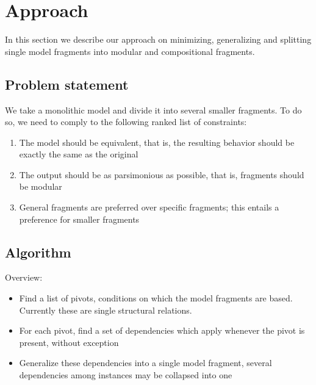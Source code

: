 \documentclass{article} %
\begin{document}
\section{Approach}

In this section we describe our approach on minimizing, generalizing and
splitting single model fragments into modular and compositional fragments.

\subsection{Problem statement}

We take a monolithic model and divide it into several smaller fragments. To do
so, we need to comply to the following ranked list of constraints:

\begin{enumerate}
\item The model should be equivalent, that is, the resulting behavior should
	be exactly the same as the original

\item The output should be as parsimonious as possible, that is, fragments
	should be modular

\item General fragments are preferred over specific fragments; this entails a
	preference for smaller fragments

\end{enumerate}

\subsection{Algorithm}

Overview:

\begin{itemize}

\item Find a list of pivots, conditions on which the model fragments are
	based. Currently these are single structural relations.

\item For each pivot, find a set of dependencies which apply whenever the
	pivot is present, without exception

\item Generalize these dependencies into a single model fragment, several
	dependencies among instances may be collapsed into one

\end{itemize}
\end{document}

